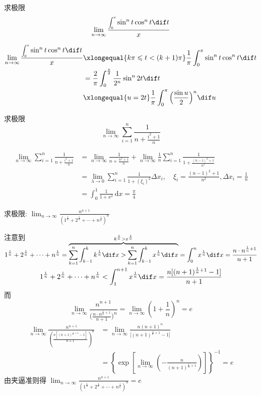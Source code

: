 \documentclass[color=green,titlestyle=hang]{elegantbook}%
\begin{document}
\begin{example}
求极限\[\lim_{n\to\infty}\frac{\scaleobj{0.75}{\displaystyle\int_0^x}\sin^nt\cos^nt\dif t}{x}\]
\end{example}\begin{solution}
\begin{align*}
\lim_{n\to\infty}\frac{\scaleobj{0.75}{\displaystyle\int_0^x}\sin^nt\cos^nt\dif t}{x}
&\xlongequal{k\pi\leqslant t<(k+1)\pi}\frac{1}{\pi}\int_0^\pi\sin^nt\cos^nt\dif t\\
&=\frac{2}{\pi}\int_0^{\frac{\pi}{2}}\frac{1}{2^n}\sin^n2t\dif t\\
&\xlongequal{u=2t}\frac{1}{\pi}\int_0^\pi\Big(\frac{\sin u}{2}\Big)^n\dif u
\end{align*}
\end{solution}

\begin{exercise}
求极限\begin{equation*}\lim_{n\to\infty}\sum_{i=1}^{n}\frac{1}{n+\frac{i^2+1}{n}}\end{equation*}
\end{exercise}
\begin{solution}
\begin{align*}
\lim_{n\to\infty}\sum_{i=1}^{n}\frac{1}{n+\frac{i^2+1}{n}}&=\lim_{n\to\infty}\frac{1}{n+\frac{n^2+1}{n}}+\lim_{n\to\infty}\frac{1}{n}\sum_{i=1}^{n}\frac{1}{1+\frac{(n-1)^2+1}{n^2}}\\
&=\lim_{\lambda\to0}\sum_{i=1}^{n}\frac{1}{1+(\xi_i)^2}\Delta x_i,\quad\xi_i=\frac{(n-1)^2+1}{n^2},\Delta x_i=\frac{1}{n}\\
&=\int_0^1\frac{1}{1+x^2}\,\mathrm{d}x=\frac{\pi}{4}
\end{align*}	
\end{solution}

\begin{example}
求极限: $\lim_{n\to\infty}\frac{n^{n+1}}{(1^{\frac{1}{n}}+2^{\frac{1}{n}}+\cdots+n^{\frac{1}{n}})^n}$
\end{example}\begin{solution}
注意到\[1^{\frac{1}{n}}+2^{\frac{1}{n}}+\cdots+n^{\frac{1}{n}}=\smash{\overbrace{\sum_{k=1}^{n}\int_{k-1}^{k}k^{\frac{1}{n}}\dif x>\sum_{k=1}^{n}\int_{k-1}^{k}x^{\frac{1}{n}}\dif x}^{k^{\frac{1}{n}}>x^{\frac{1}{n}}}}=\int_0^{n}x^{\frac{1}{n}}\dif x=\frac{n\cdot n^{\frac{1}{n}+1}}{n+1}\]
\[1^{\frac{1}{n}}+2^{\frac{1}{n}}+\cdots+n^{\frac{1}{n}}<\int_1^{n+1}x^{\frac{1}{n}}\dif x=\frac{n[(n+1)^{\frac{1}{n}+1}-1]}{n+1}\]
而\[\lim_{n\to\infty}\frac{n^{n+1}}{\Big(\frac{n\cdot n^{\frac{1}{n}+1}}{n+1}\Big)^n}=\lim_{n\to\infty}\left(1+\frac{1}{n}\right)^n=e\]
\begin{align*}
\lim_{n\to\infty}\frac{n^{n+1}}{\left(\frac{n[(n+1)^{\frac{1}{n}+1}-1]}{n+1}\right)^n}
&=\lim_{n\to\infty}\frac{n(n+1)^n}{\big[(n+1)^{\frac{1}{n}+1}-1\big]}\\
&=\left\{\exp\left[\lim_{n\to\infty}\left(-\frac{n}{(n+1)^{\frac{1}{n}+1}}\right)\right]\right\}^{-1}=e
\end{align*}
由夹逼准则得 $\lim_{n\to\infty}\frac{n^{n+1}}{(1^{\frac{1}{n}}+2^{\frac{1}{n}}+\cdots+n^{\frac{1}{n}})^n}=e$
\end{solution}
\end{document}
